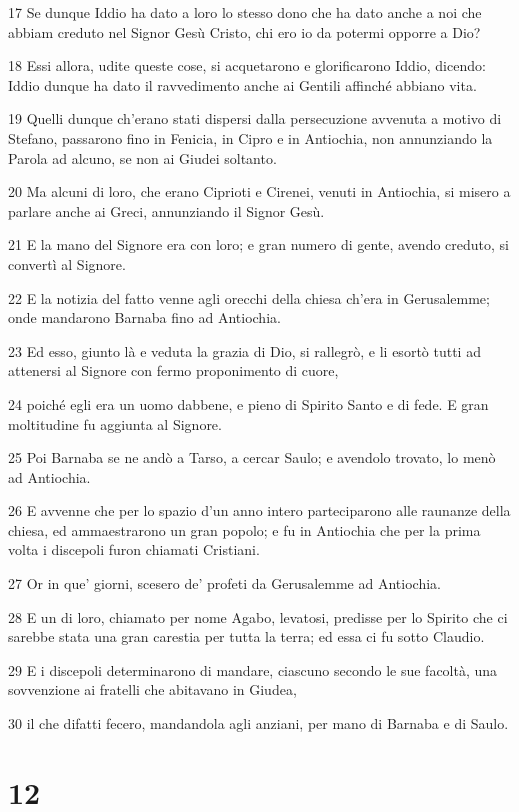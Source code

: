 \par 17 Se dunque Iddio ha dato a loro lo stesso dono che ha dato anche a noi che abbiam creduto nel Signor Gesù Cristo, chi ero io da potermi opporre a Dio?
\par 18 Essi allora, udite queste cose, si acquetarono e glorificarono Iddio, dicendo: Iddio dunque ha dato il ravvedimento anche ai Gentili affinché abbiano vita.
\par 19 Quelli dunque ch'erano stati dispersi dalla persecuzione avvenuta a motivo di Stefano, passarono fino in Fenicia, in Cipro e in Antiochia, non annunziando la Parola ad alcuno, se non ai Giudei soltanto.
\par 20 Ma alcuni di loro, che erano Ciprioti e Cirenei, venuti in Antiochia, si misero a parlare anche ai Greci, annunziando il Signor Gesù.
\par 21 E la mano del Signore era con loro; e gran numero di gente, avendo creduto, si convertì al Signore.
\par 22 E la notizia del fatto venne agli orecchi della chiesa ch'era in Gerusalemme; onde mandarono Barnaba fino ad Antiochia.
\par 23 Ed esso, giunto là e veduta la grazia di Dio, si rallegrò, e li esortò tutti ad attenersi al Signore con fermo proponimento di cuore,
\par 24 poiché egli era un uomo dabbene, e pieno di Spirito Santo e di fede. E gran moltitudine fu aggiunta al Signore.
\par 25 Poi Barnaba se ne andò a Tarso, a cercar Saulo; e avendolo trovato, lo menò ad Antiochia.
\par 26 E avvenne che per lo spazio d'un anno intero parteciparono alle raunanze della chiesa, ed ammaestrarono un gran popolo; e fu in Antiochia che per la prima volta i discepoli furon chiamati Cristiani.
\par 27 Or in que' giorni, scesero de' profeti da Gerusalemme ad Antiochia.
\par 28 E un di loro, chiamato per nome Agabo, levatosi, predisse per lo Spirito che ci sarebbe stata una gran carestia per tutta la terra; ed essa ci fu sotto Claudio.
\par 29 E i discepoli determinarono di mandare, ciascuno secondo le sue facoltà, una sovvenzione ai fratelli che abitavano in Giudea,
\par 30 il che difatti fecero, mandandola agli anziani, per mano di Barnaba e di Saulo.

\chapter{12}

